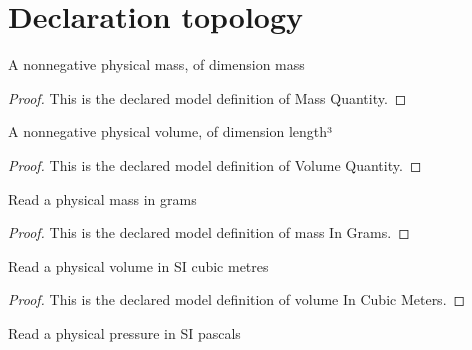 \section{Declaration topology}
\begin{definition}
  \label{def:physics:phyx-mini-0367:phyxminiproblems-problemphyxmini0367-massquantity}
  A nonnegative physical mass, of dimension mass
\end{definition}
\begin{proof}
  This is the declared model definition of Mass Quantity.
\end{proof}
\begin{definition}
  \label{def:physics:phyx-mini-0367:phyxminiproblems-problemphyxmini0367-volumequantity}
  A nonnegative physical volume, of dimension length³
\end{definition}
\begin{proof}
  This is the declared model definition of Volume Quantity.
\end{proof}
\begin{definition}
  \label{def:physics:phyx-mini-0367:phyxminiproblems-problemphyxmini0367-massingrams}
  Read a physical mass in grams
\end{definition}
\begin{proof}
  This is the declared model definition of mass In Grams.
\end{proof}
\begin{definition}
  \label{def:physics:phyx-mini-0367:phyxminiproblems-problemphyxmini0367-volumeincubicmeters}
  Read a physical volume in SI cubic metres
\end{definition}
\begin{proof}
  This is the declared model definition of volume In Cubic Meters.
\end{proof}
\begin{definition}
  \label{def:physics:phyx-mini-0367:phyxminiproblems-problemphyxmini0367-pressureinpascals}
  Read a physical pressure in SI pascals
\end{definition}
